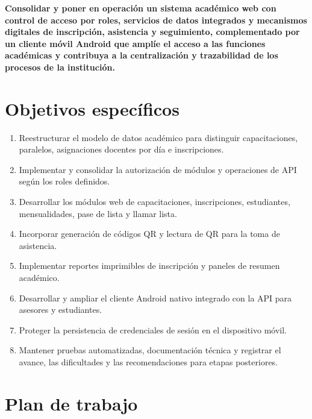 \documentclass[12pt,a4paper,oneside]{report}
\begin{document}
\textbf{Consolidar y poner en operación un sistema académico web con control de acceso por roles, servicios de datos integrados y mecanismos digitales de inscripción, asistencia y seguimiento, complementado por un cliente móvil Android que amplíe el acceso a las funciones académicas y contribuya a la centralización y trazabilidad de los procesos de la institución.}

\section{Objetivos específicos}

\begin{enumerate}[label=\textbf{\arabic*.},leftmargin=1.6em]
  \item Reestructurar el modelo de datos académico para distinguir capacitaciones, paralelos, asignaciones docentes por día e inscripciones.
  \item Implementar y consolidar la autorización de módulos y operaciones de API según los roles definidos.
  \item Desarrollar los módulos web de capacitaciones, inscripciones, estudiantes, mensualidades, pase de lista y llamar lista.
  \item Incorporar generación de códigos QR y lectura de QR para la toma de asistencia.
  \item Implementar reportes imprimibles de inscripción y paneles de resumen académico.
  \item Desarrollar y ampliar el cliente Android nativo integrado con la API para asesores y estudiantes.
  \item Proteger la persistencia de credenciales de sesión en el dispositivo móvil.
  \item Mantener pruebas automatizadas, documentación técnica y registrar el avance, las dificultades y las recomendaciones para etapas posteriores.
\end{enumerate}

\section{Plan de trabajo}
\end{document}
